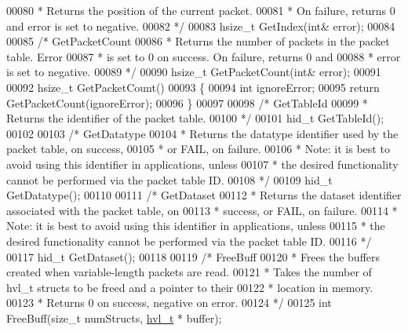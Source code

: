 \begin{DoxyCode}
00080 \textcolor{comment}{     * Returns the position of the current packet.}
00081 \textcolor{comment}{     * On failure, returns 0 and error is set to negative.}
00082 \textcolor{comment}{     */}
00083     hsize\_t GetIndex(\textcolor{keywordtype}{int}& error);
00084 
00085     \textcolor{comment}{/* GetPacketCount}
00086 \textcolor{comment}{     * Returns the number of packets in the packet table.  Error}
00087 \textcolor{comment}{     * is set to 0 on success.  On failure, returns 0 and}
00088 \textcolor{comment}{     * error is set to negative.}
00089 \textcolor{comment}{     */}
00090     hsize\_t GetPacketCount(\textcolor{keywordtype}{int}& error);
00091 
00092     hsize\_t GetPacketCount()
00093     \{
00094         \textcolor{keywordtype}{int} ignoreError;
00095         \textcolor{keywordflow}{return} GetPacketCount(ignoreError);
00096     \}
00097 
00098     \textcolor{comment}{/* GetTableId}
00099 \textcolor{comment}{     * Returns the identifier of the packet table.}
00100 \textcolor{comment}{     */}
00101     hid\_t GetTableId();
00102 
00103     \textcolor{comment}{/* GetDatatype}
00104 \textcolor{comment}{     * Returns the datatype identifier used by the packet table, on success,}
00105 \textcolor{comment}{     * or FAIL, on failure.}
00106 \textcolor{comment}{     * Note: it is best to avoid using this identifier in applications, unless}
00107 \textcolor{comment}{     * the desired functionality cannot be performed via the packet table ID.}
00108 \textcolor{comment}{     */}
00109     hid\_t GetDatatype();
00110 
00111     \textcolor{comment}{/* GetDataset}
00112 \textcolor{comment}{     * Returns the dataset identifier associated with the packet table, on}
00113 \textcolor{comment}{     * success, or FAIL, on failure.}
00114 \textcolor{comment}{     * Note: it is best to avoid using this identifier in applications, unless}
00115 \textcolor{comment}{     * the desired functionality cannot be performed via the packet table ID.}
00116 \textcolor{comment}{     */}
00117     hid\_t GetDataset();
00118 
00119     \textcolor{comment}{/* FreeBuff}
00120 \textcolor{comment}{     * Frees the buffers created when variable-length packets are read.}
00121 \textcolor{comment}{     * Takes the number of hvl\_t structs to be freed and a pointer to their}
00122 \textcolor{comment}{     * location in memory.}
00123 \textcolor{comment}{     * Returns 0 on success, negative on error.}
00124 \textcolor{comment}{     */}
00125     \textcolor{keywordtype}{int} FreeBuff(\textcolor{keywordtype}{size\_t} numStructs, \hyperlink{structhvl__t}{hvl\_t} * buffer);

\end{DoxyCode}
